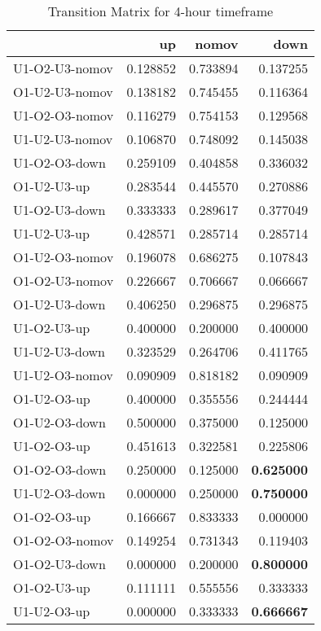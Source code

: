 \begin{table}[H]
\caption{Transition Matrix for 4-hour timeframe}
\centering
\begin{tabular}{lrrr}
\toprule
{} &        up &     nomov &      down \\
\midrule
U1-O2-U3-nomov &  0.128852 &  0.733894 &  0.137255 \\
O1-U2-U3-nomov &  0.138182 &  0.745455 &  0.116364 \\
U1-O2-O3-nomov &  0.116279 &  0.754153 &  0.129568 \\
U1-U2-U3-nomov &  0.106870 &  0.748092 &  0.145038 \\
U1-O2-O3-down  &  0.259109 &  0.404858 &  0.336032 \\
O1-U2-U3-up    &  0.283544 &  0.445570 &  0.270886 \\
U1-O2-U3-down  &  0.333333 &  0.289617 &  0.377049 \\
U1-U2-U3-up    &  0.428571 &  0.285714 &  0.285714 \\
O1-U2-O3-nomov &  0.196078 &  0.686275 &  0.107843 \\
O1-O2-U3-nomov &  0.226667 &  0.706667 &  0.066667 \\
O1-U2-U3-down  &  0.406250 &  0.296875 &  0.296875 \\
U1-O2-U3-up    &  0.400000 &  0.200000 &  0.400000 \\
U1-U2-U3-down  &  0.323529 &  0.264706 &  0.411765 \\
U1-U2-O3-nomov &  0.090909 &  0.818182 &  0.090909 \\
O1-U2-O3-up    &  0.400000 &  0.355556 &  0.244444 \\
O1-U2-O3-down  &  0.500000 &  0.375000 &  0.125000 \\
U1-O2-O3-up    &  0.451613 &  0.322581 &  0.225806 \\
O1-O2-O3-down  &  0.250000 &  0.125000 &  \textbf{0.625000} \\
U1-U2-O3-down  &  0.000000 &  0.250000 &  \textbf{0.750000} \\
O1-O2-O3-up    &  0.166667 &  0.833333 &  0.000000 \\
O1-O2-O3-nomov &  0.149254 &  0.731343 &  0.119403 \\
O1-O2-U3-down  &  0.000000 &  0.200000 &  \textbf{0.800000} \\
O1-O2-U3-up    &  0.111111 &  0.555556 &  0.333333 \\
U1-U2-O3-up    &  0.000000 &  0.333333 &  \textbf{0.666667} \\
\bottomrule
\end{tabular}
\label{Tab: four_h_markov}
\end{table}




